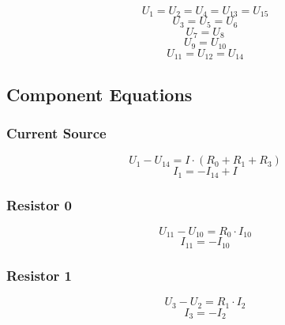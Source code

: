 \documentclass[10pt,a4paper]{article}
\begin{document}
\begin{equation*}
  U_{1} = U_{2} = U_{4} = U_{13} = U_{15}
\end{equation*}
\begin{equation*}
  U_{3} = U_{5} = U_{6}
\end{equation*}
\begin{equation*}
  U_{7} = U_{8}
\end{equation*}
\begin{equation*}
  U_{9} = U_{10}
\end{equation*}
\begin{equation*}
  U_{11} = U_{12} = U_{14}
\end{equation*}

\subsection*{Component Equations}

\subsubsection*{Current Source}

\begin{equation*}
  U_{1} - U_{14} = I \cdot (R_{0} + R_{1} + R_{3})
\end{equation*}
\begin{equation*}
  I_{1} = -I_{14} + I
\end{equation*}

\subsubsection*{Resistor 0}

\begin{equation*}
  U_{11} - U_{10} = R_{0} \cdot I_{10}
\end{equation*}
\begin{equation*}
  I_{11} = -I_{10}
\end{equation*}

\subsubsection*{Resistor 1}

\begin{equation*}
  U_{3} - U_{2} = R_{1} \cdot I_{2}
\end{equation*}
\begin{equation*}
  I_{3} = -I_{2}
\end{equation*}
\end{document}
